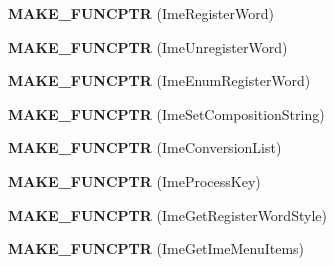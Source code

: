 \begin{DoxyCompactItemize}
\mbox{\label{struct__tag_imm_hkl_af0c4011b18fc72c81e10940d85c4ef8c}} 
{\bfseries M\+A\+K\+E\+\_\+\+F\+U\+N\+C\+P\+TR} (Ime\+Register\+Word)
\item 
\mbox{\label{struct__tag_imm_hkl_a35ae63172e2ce08380df37cf19d628bd}} 
{\bfseries M\+A\+K\+E\+\_\+\+F\+U\+N\+C\+P\+TR} (Ime\+Unregister\+Word)
\item 
\mbox{\label{struct__tag_imm_hkl_abcafedae0f364ee998ccb1192889ff8a}} 
{\bfseries M\+A\+K\+E\+\_\+\+F\+U\+N\+C\+P\+TR} (Ime\+Enum\+Register\+Word)
\item 
\mbox{\label{struct__tag_imm_hkl_a99d99e138efdcf2570bd3dd735704f0b}} 
{\bfseries M\+A\+K\+E\+\_\+\+F\+U\+N\+C\+P\+TR} (Ime\+Set\+Composition\+String)
\item 
\mbox{\label{struct__tag_imm_hkl_a9b3931b7c725ac1a5c331dd66ca3a69a}} 
{\bfseries M\+A\+K\+E\+\_\+\+F\+U\+N\+C\+P\+TR} (Ime\+Conversion\+List)
\item 
\mbox{\label{struct__tag_imm_hkl_a821f8b7576f90e872aee9428e760fa2e}} 
{\bfseries M\+A\+K\+E\+\_\+\+F\+U\+N\+C\+P\+TR} (Ime\+Process\+Key)
\item 
\mbox{\label{struct__tag_imm_hkl_a2eb78aca89011f92c23b6c9c102c59eb}} 
{\bfseries M\+A\+K\+E\+\_\+\+F\+U\+N\+C\+P\+TR} (Ime\+Get\+Register\+Word\+Style)
\item 
\mbox{\label{struct__tag_imm_hkl_a90379ca5c51ffc8067c0afba2f917b37}} 
{\bfseries M\+A\+K\+E\+\_\+\+F\+U\+N\+C\+P\+TR} (Ime\+Get\+Ime\+Menu\+Items)
\end{DoxyCompactItemize}
